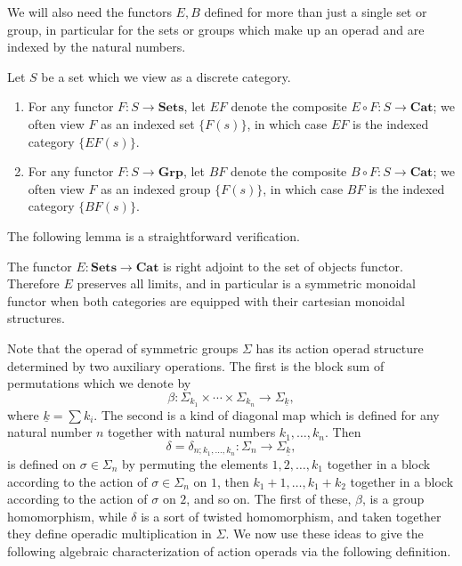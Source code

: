 \documentclass{amsbook} %
\newcommand{\mb}{\mathbf}
\numberwithin{section}{chapter}
\begin{document}
We will also need the functors $E, B$ defined for more than just a single set or group, in particular for the sets or groups which make up an operad and are indexed by the natural numbers.

\begin{nota}\label{nota:e_b}
Let $S$ be a set which we view as a discrete category.
\begin{enumerate}
\item For any functor $F:S \rightarrow \mb{Sets}$, let $EF$ denote the composite $E \circ F:S \rightarrow \mb{Cat}$; we often view $F$ as an indexed set $\{ F(s) \}$, in which case $EF$ is the indexed category $\{ EF(s) \}$.
\item For any functor $F:S \rightarrow \mb{Grp}$, let $BF$ denote the composite $B \circ F:S \rightarrow \mb{Cat}$; we often view $F$ as an indexed group $\{ F(s) \}$, in which case $BF$ is the indexed category $\{ BF(s) \}$.
\end{enumerate}
\end{nota}

The following lemma is a straightforward verification.

\begin{lem}\label{symmoncor}
The functor $E:\mb{Sets} \rightarrow \mb{Cat}$ is right adjoint to the set of objects functor.  Therefore $E$ preserves all limits, and in particular is a symmetric monoidal functor when both categories are equipped with their cartesian monoidal structures.
\end{lem}


Note that the operad of symmetric groups $\Sigma$ has its action operad structure determined by two auxiliary operations.  The first is the block sum of permutations which we denote by
\[
\beta: \Sigma_{k_{1}} \times \cdots \times \Sigma_{k_{n}} \rightarrow \Sigma_{\underline{k}},
\]
where $\underline{k} = \sum k_{i}$.  The second is a kind of diagonal map which is defined for any natural number $n$ together with natural numbers $k_{1}, \ldots, k_{n}$.  Then
\[
\delta = \delta_{n; k_{1}, \ldots, k_{n}}:\Sigma_{n} \rightarrow \Sigma_{\underline{k}},
\]
is defined on $\sigma \in \Sigma_{n}$ by permuting the elements $1, 2, \ldots, k_{1}$ together in a block according to the action of $\sigma \in \Sigma_{n}$ on $1$, then $k_{1}+1, \ldots, k_{1}+k_{2}$ together in a block according to the action of $\sigma$ on $2$, and so on.  The first of these, $\beta$, is a group homomorphism, while $\delta$ is a sort of twisted homomorphism, and taken together they define operadic multiplication in $\Sigma$.  We now use these ideas to give the following algebraic characterization of action operads via the following definition.
\end{document}
